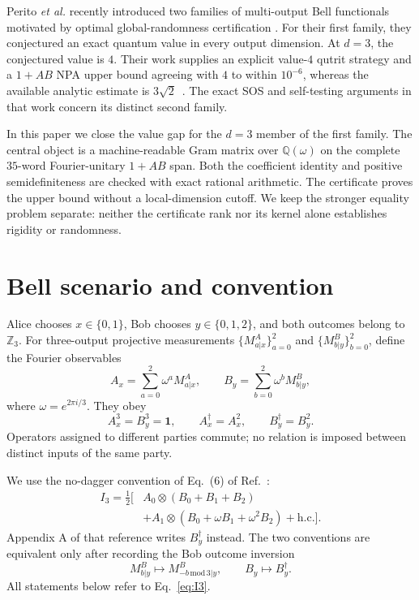 \documentclass[aps,pra,reprint,superscriptaddress,nofootinbib,longbibliography]{revtex4-2}
\newcommand{\id}{\mathbf{1}}
\newcommand{\Q}{\mathbb{Q}}
\begin{document}
Perito \textit{et al.} recently introduced two families of multi-output Bell
functionals motivated by optimal global-randomness certification
\cite{Perito2026}.  For their first family, they conjectured an exact quantum
value in every output dimension.  At $d=3$, the conjectured value is $4$.
Their work supplies an explicit value-$4$ qutrit strategy and a $1+AB$ NPA
upper bound agreeing with $4$ to within $10^{-6}$, whereas the available
analytic estimate is $3\sqrt{2}$~\cite{Perito2026}.  The exact SOS and
self-testing arguments in that work concern its distinct second family.

In this paper we close the value gap for the $d=3$ member of the first family.
The central object is a machine-readable Gram matrix over $\Q(\omega)$ on the
complete $35$-word Fourier-unitary $1+AB$ span.  Both the coefficient identity
and positive semidefiniteness are checked with exact rational arithmetic.  The
certificate proves the upper bound without a local-dimension cutoff.  We keep
the stronger equality problem separate: neither the certificate rank nor its
kernel alone establishes rigidity or randomness.

\section{Bell scenario and convention}

Alice chooses $x\in\{0,1\}$, Bob chooses $y\in\{0,1,2\}$, and both outcomes
belong to $\mathbb Z_3$.  For three-output projective measurements
$\{M^A_{a|x}\}_{a=0}^2$ and $\{M^B_{b|y}\}_{b=0}^2$, define the Fourier
observables
\begin{equation}
 A_x=\sum_{a=0}^2\omega^a M^A_{a|x},\qquad
 B_y=\sum_{b=0}^2\omega^b M^B_{b|y},
 \label{eq:fourier}
\end{equation}
where $\omega=e^{2\pi i/3}$.  They obey
\begin{equation}
 A_x^3=B_y^3=\id,\qquad A_x^\dagger=A_x^2,
 \qquad B_y^\dagger=B_y^2.
 \label{eq:relations}
\end{equation}
Operators assigned to different parties commute; no relation is imposed
between distinct inputs of the same party.

We use the no-dagger convention of Eq.~(6) of Ref.~\cite{Perito2026}:
\begin{align}
 I_3=\frac12\bigg[&A_0\otimes(B_0+B_1+B_2) \nonumber\\
 &+A_1\otimes(B_0+\omega B_1+\omega^2B_2)
 +\mathrm{h.c.}\bigg].
 \label{eq:I3}
\end{align}
Appendix A of that reference writes $B_y^\dagger$ instead.  The two conventions
are equivalent only after recording the Bob outcome inversion
\begin{equation}
 M^B_{b|y}\longmapsto M^B_{-b\,\mathrm{mod}\,3|y},
 \qquad B_y\longmapsto B_y^\dagger.
 \label{eq:outcome-inversion}
\end{equation}
All statements below refer to Eq.~\eqref{eq:I3}.
\end{document}
